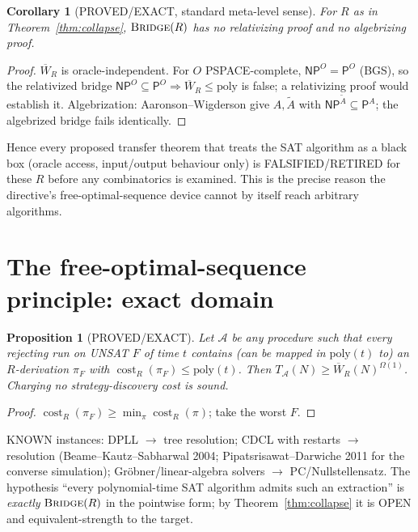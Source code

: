 \documentclass[11pt]{article}
\newtheorem{proposition}[theorem]{Proposition}
\newtheorem{corollary}[theorem]{Corollary}
\newcommand{\Pclass}{\mathsf{P}}
\newcommand{\NP}{\mathsf{NP}}
\begin{document}
\begin{corollary}[PROVED/EXACT, standard meta-level sense]\label{cor:rel}
For $R$ as in Theorem~\ref{thm:collapse}, $\textsc{Bridge}(R)$ has no relativizing proof and no
algebrizing proof.
\end{corollary}
\begin{proof}
$\overline W_R$ is oracle-independent. For $O$ PSPACE-complete, $\NP^O=\Pclass^O$ (BGS), so the
relativized bridge $\NP^O\subseteq\Pclass^O\Rightarrow\overline W_R\le\mathrm{poly}$ is false; a relativizing
proof would establish it. Algebrization: Aaronson--Wigderson give $A,\tilde A$ with
$\NP^{\tilde A}\subseteq\Pclass^{A}$; the algebrized bridge fails identically.
\end{proof}
Hence every proposed transfer theorem that treats the SAT algorithm as a black box
(oracle access, input/output behaviour only) is FALSIFIED/RETIRED for these $R$ before any
combinatorics is examined. This is the precise reason the directive's free-optimal-sequence
device cannot by itself reach arbitrary algorithms.

\section{The free-optimal-sequence principle: exact domain}
\begin{proposition}[PROVED/EXACT]\label{prop:free}
Let $\mathcal A$ be any procedure such that every rejecting run on UNSAT $F$ of time $t$
\emph{contains} (can be mapped in $\mathrm{poly}(t)$ to) an $R$-derivation $\pi_F$ with
$\operatorname{cost}_R(\pi_F)\le \mathrm{poly}(t)$. Then $T_{\mathcal A}(N)\ge \overline W_R(N)^{\Omega(1)}$.
Charging no strategy-discovery cost is sound.
\end{proposition}
\begin{proof}
$\operatorname{cost}_R(\pi_F)\ge\min_\pi\operatorname{cost}_R(\pi)$; take the worst $F$.
\end{proof}
KNOWN instances: DPLL $\to$ tree resolution; CDCL with restarts $\to$ resolution
(Beame--Kautz--Sabharwal 2004; Pipatsrisawat--Darwiche 2011 for the converse simulation);
Gr\"obner/linear-algebra solvers $\to$ PC/Nullstellensatz. The hypothesis ``every polynomial-time
SAT algorithm admits such an extraction'' is \emph{exactly} $\textsc{Bridge}(R)$ in the
pointwise form; by Theorem~\ref{thm:collapse} it is OPEN and equivalent-strength to the target.
\end{document}
